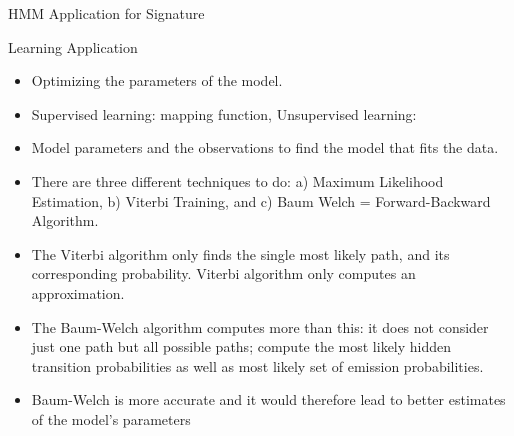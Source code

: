 \documentclass[aspectratio=1610]{beamer}
\begin{document}
\begin{frame}{HMM Application for Signature}
\begin{block}{Learning Application}
\end{block}
\begin{itemize}

\item Optimizing the parameters of the model.

\item Supervised learning: mapping function,  Unsupervised learning: 

\item Model parameters and the observations to find the model that fits the data. 

\item There are three different techniques to do: a) Maximum Likelihood Estimation, b) Viterbi Training, and c) Baum  Welch = Forward-Backward Algorithm.

\item The Viterbi algorithm only finds the single most likely path, and its corresponding probability. Viterbi algorithm only computes an approximation.
\item The Baum-Welch algorithm computes more than this: it does not consider just one path but all possible paths; compute the most likely hidden transition probabilities as well as most likely set of emission probabilities.

\item  Baum-Welch is more accurate and it would therefore lead to better estimates of the model's parameters

 


\end{itemize}
\end{frame}
\end{document}
